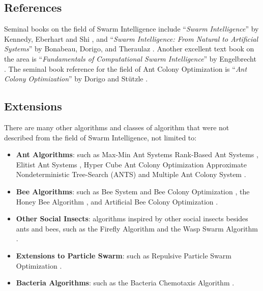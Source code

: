 \begin{bibunit}
\subsection{References}
Seminal books on the field of Swarm Intelligence include ``\emph{Swarm Intelligence}'' by Kennedy, Eberhart and Shi \cite{Kennedy2001}, and ``\emph{Swarm Intelligence: From Natural to Artificial Systems}'' by Bonabeau, Dorigo, and Theraulaz \cite{Bonabeau1999}. Another excellent text book on the area is ``\emph{Fundamentals of Computational Swarm Intelligence}'' by Engelbrecht \cite{Engelbrecht2006}. The seminal book reference for the field of Ant Colony Optimization is ``\emph{Ant Colony Optimization}'' by Dorigo and St\"utzle \cite{Dorigo2004}.

% 
% 
\subsection{Extensions}
There are many other algorithms and classes of algorithm that were not described from the field of Swarm Intelligence, not limited to:

\begin{itemize}
	\item \textbf{Ant Algorithms}: such as Max-Min Ant Systems \cite{Stutzle2000} Rank-Based Ant Systems \cite{Bullnheimer1999}, Elitist Ant Systems \cite{Dorigo1996}, Hyper Cube Ant Colony Optimization \cite{Blum2001} Approximate Nondeterministic Tree-Search (ANTS) \cite{Maniezzo1999} and Multiple Ant Colony System \cite{Gambardella1999}.
	\item \textbf{Bee Algorithms}: such as Bee System and Bee Colony Optimization \cite{Lucic2001}, the Honey Bee Algorithm \cite{Tovey2004}, and Artificial Bee Colony Optimization \cite{Karaboga2005, Basturk2006}.
	\item \textbf{Other Social Insects}: algorithms inspired by other social insects besides ants and bees, such as the Fireﬂy Algorithm \cite{Yang2008} and the Wasp Swarm Algorithm \cite{Pinto2007}.
	\item \textbf{Extensions to Particle Swarm}: such as Repulsive Particle Swarm Optimization \cite{Urfalioglu2004}.
	\item \textbf{Bacteria Algorithms}: such as the Bacteria Chemotaxis Algorithm \cite{Muller2002}.
\end{itemize}

\putbib
\end{bibunit}


\newpage\begin{bibunit}\putbib\end{bibunit}
\newpage\begin{bibunit}\putbib\end{bibunit}
\newpage\begin{bibunit}\putbib\end{bibunit}
\newpage\begin{bibunit}\putbib\end{bibunit}
\newpage\begin{bibunit}\putbib\end{bibunit}
